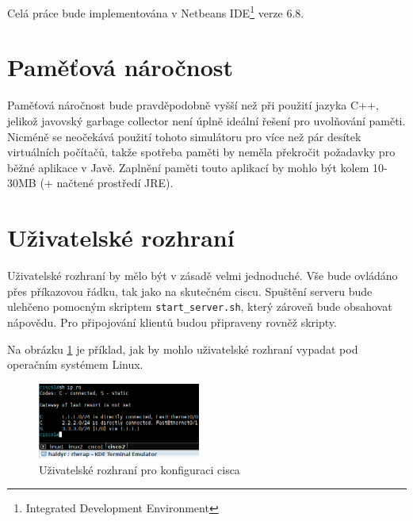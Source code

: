 Celá práce bude implementována v Netbeans IDE\footnote{Integrated Development Environment} verze 6.8.


\section{Paměťová náročnost}
Paměťová náročnost bude pravděpodobně vyšší než při použití jazyka C++, jelikož javovský garbage collector není úplně ideální řešení pro uvolňování paměti. Nicméně se neočekává použití tohoto simulátoru pro více než pár desítek virtuálních počítačů, takže spotřeba paměti by neměla překročit požadavky pro běžné aplikace v Javě. Zaplnění paměti touto aplikací by mohlo být kolem 10-30MB (+ načtené prostředí JRE).


\section{Uživatelské rozhraní}
Uživatelské rozhraní by mělo být v zásadě velmi jednoduché. Vše bude ovládáno přes příkazovou řádku, tak jako na skutečném ciscu. Spuštění serveru bude ulehčeno pomocným skriptem \verb|start_server.sh|, který zároveň bude obsahovat nápovědu. Pro připojování klientů budou připraveny rovněž skripty. 

Na obrázku \ref{fig:uziv_rozh} je příklad, jak by mohlo uživatelské rozhraní vypadat pod operačním systémem Linux.


\begin{figure}[h]
\begin{center}
\includegraphics[height=2.5cm]{figures/uziv_rozhrani}
\caption{Uživatelské rozhraní pro konfiguraci cisca}
\label{fig:uziv_rozh}
\end{center}
\end{figure}

